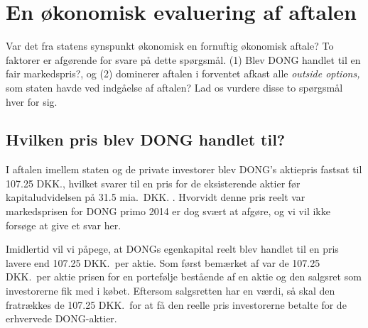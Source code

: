 \documentclass{article}
\begin{document}
\section{En økonomisk evaluering af aftalen}

Var det fra statens synspunkt økonomisk en fornuftig økonomisk aftale? To faktorer er afgørende for svare på dette spørgsmål. (1) Blev DONG handlet til en fair markedspris?, og (2) dominerer aftalen i forventet afkast  alle \emph{outside options,} som staten havde ved indgåelse af aftalen? Lad os vurdere disse to spørgsmål hver for sig.

\subsection{Hvilken pris blev DONG handlet til?}

I aftalen imellem staten og de private investorer blev  DONG's aktiepris fastsat til 107.25 DKK., hvilket svarer til en pris for de eksisterende aktier før kapitaludvidelsen på 31.5 mia.\ DKK. \citep{FM2013a}. Hvorvidt denne pris reelt var markedsprisen for DONG primo 2014 er dog svært at afgøre, og vi vil ikke forsøge at give et svar her. 

Imidlertid vil vi påpege, at DONGs egenkapital reelt blev handlet til en pris lavere end 107.25 DKK.\ per aktie. Som først bemærket af \cite{Moeller2014} var de 107.25 DKK.\ per aktie prisen for en portefølje bestående af en aktie og den salgsret som investorerne fik med i købet. Eftersom salgsretten har en værdi, så skal den fratrækkes de 107.25 DKK.\ for at få den reelle pris investorerne betalte for de erhvervede DONG-aktier.
\end{document}
